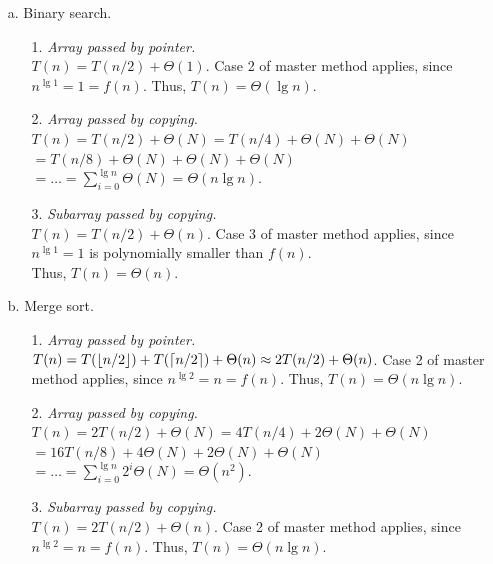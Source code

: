 \begin{enumerate}
\begin{framed}
  \begin{enumerate}
    \item[a.] Binary search.
      \begin{enumerate}
        \item[1.] \emph{Array passed by pointer.}\\
          $T(n) = T(n/2) + \Theta(1)$.
          Case 2 of master method applies, since
          $n^{\lg 1} = 1 = f(n)$. Thus, $T(n) = \Theta(\lg n)$.
        \item[2.] \emph{Array passed by copying.}\\
          $T(n) = T(n/2) + \Theta(N) = T(n/4) + \Theta(N) + \Theta(N)$
          $= T(n/8) + \Theta(N) + \Theta(N) + \Theta(N)$
          $= \dots = \sum_{i = 0}^{\lg n} \Theta(N) = \Theta(n \lg n)$.
        \item[3.] \emph{Subarray passed by copying.}\\
          $T(n) = T(n/2) + \Theta(n)$.
          Case 3 of master method applies, since $n^{\lg 1} = 1$ is
          polynomially smaller than $f(n)$.\\
          Thus, $T(n) = \Theta(n)$.
      \end{enumerate}
    \item[b.] Merge sort.
      \begin{enumerate}
        \item[1.] \emph{Array passed by pointer.}\\
          $T(n) = T(\lfloor n/2\rfloor) + T(\lceil n/2\rceil) + \Theta(n) \approx 2T(n/2) + \Theta(n)$.
          Case 2 of master method applies, since
          $n^{\lg 2} = n = f(n)$. Thus, $T(n) = \Theta(n \lg n)$.
        \item[2.] \emph{Array passed by copying.}\\
          $T(n) = 2T(n/2) + \Theta(N) = 4T(n/4) + 2\Theta(N) + \Theta(N)$
          $= 16T(n/8) + 4\Theta(N) + 2\Theta(N) + \Theta(N)$
          $= \dots = \sum_{i = 0}^{\lg n} 2^i \Theta(N) = \Theta(n^2)$.
        \item[3.] \emph{Subarray passed by copying.}\\
          $T(n) = 2T(n/2) + \Theta(n)$.
          Case 2 of master method applies, since
          $n^{\lg 2} = n = f(n)$. Thus, $T(n) = \Theta(n \lg n)$.
      \end{enumerate}
  \end{enumerate}
\end{framed}


\end{enumerate}
